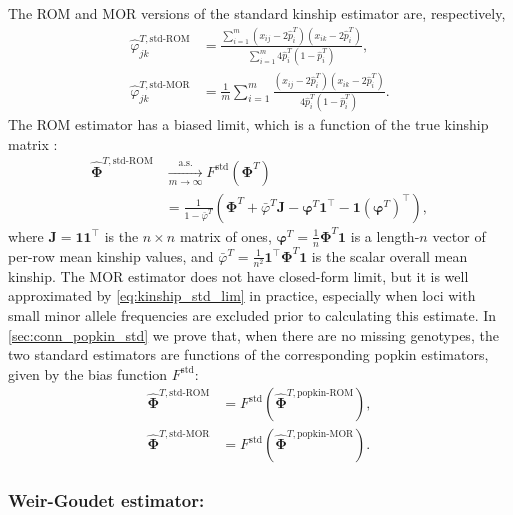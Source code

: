 \documentclass[9pt,twocolumn,twoside]{gsajnl}
\newcommand{\xij}[1][j]{x_{i#1}}
\newcommand{\pith}{\hat{p}_i^T}
\newcommand{\ktHatNamed}[2][k]{\hat{\varphi}_{j#1}^{T,\text{#2}}}
\newcommand{\kinMat}[1][T]{\mathbf{\Phi}^{#1}}
\newcommand{\kinMatEstNamed}[1]{\mathbf{\hat{\Phi}}^{T,\text{#1}}}
\newcommand{\toas}{\xrightarrow[m \rightarrow \infty]{\text{a.s.}}}
\begin{document}
The ROM and MOR versions of the standard kinship estimator are, respectively,
\begin{align}
  \label{eq:kinship_std_rom}
  \ktHatNamed{std-ROM}
  &=
    \frac{
    \sum\limits_{i=1}^m \left( \xij - 2 \pith \right) \left( \xij[k] - 2 \pith \right)
    }{
    \sum\limits_{i=1}^m 4 \pith \left( 1-\pith \right)
    }
    , \\
  \label{eq:kinship_std_mor}
  \ktHatNamed{std-MOR}
  &=
    \frac{1}{m} \sum\limits_{i=1}^m \frac{\left( \xij - 2 \pith \right) \left( \xij[k] - 2 \pith \right)}{4 \pith \left( 1-\pith \right)}
    .
\end{align}
The ROM estimator has a biased limit, which is a function of the true kinship matrix \citep{ochoa_estimating_2021}:
\begin{equation}
  \label{eq:kinship_std_lim}
  \begin{split}
    \kinMatEstNamed{std-ROM}
    &\toas
      F^\text{std} \left( \kinMat \right)
    \\
    &=
      \frac{1}{1 - \bar{\varphi}^T}
      \left(
      \kinMat
      + \bar{\varphi}^T \mathbf{J}
      - \boldsymbol{\varphi}^T \mathbf{1}^\intercal 
      - \mathbf{1} \left( \boldsymbol{\varphi}^T \right)^\intercal 
      \right)
      ,
  \end{split}
\end{equation}
where
$\mathbf{J} = \mathbf{1} \mathbf{1}^\intercal$ is the $n \times n$ matrix of ones,
$\boldsymbol{\varphi}^T = \frac{1}{n} \kinMat \mathbf{1}$ is a length-$n$ vector of per-row mean kinship values, and
$\bar{\varphi}^T = \frac{1}{n^2} \mathbf{1}^\intercal \kinMat \mathbf{1}$ is the scalar overall mean kinship.
The MOR estimator does not have closed-form limit, but it is well approximated by \cref{eq:kinship_std_lim} in practice, especially when loci with small minor allele frequencies are excluded prior to calculating this estimate.
In \cref{sec:conn_popkin_std} we prove that, when there are no missing genotypes, the two standard estimators are functions of the corresponding popkin estimators, given by the bias function $F^\text{std}$:
\begin{align*}
  \kinMatEstNamed{std-ROM}
  &=
    F^\text{std} \left( \kinMatEstNamed{popkin-ROM} \right)
    , \\
  \kinMatEstNamed{std-MOR}
  &=
    F^\text{std} \left( \kinMatEstNamed{popkin-MOR} \right)
    .
\end{align*}

\subsubsection{Weir-Goudet estimator:}
\end{document}
